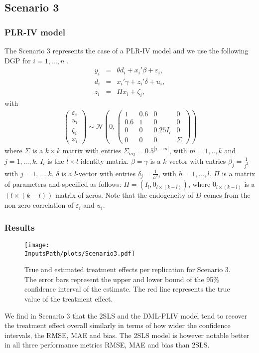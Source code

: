 \documentclass[10pt]{article}
\newcommand*{\InputsFolderPath}{C:/DEV/DML/src/data/}
\newcommand*{\InputsPath}{\InputsFolderPath/20221110/}
\begin{document}
\subsection{Scenario 3}
\subsubsection{PLR-IV model}
The Scenario 3 represents the case of a PLR-IV model and we use the following DGP for $i=1,...,n$ \cite{Cher2015}.
\begin{eqnarray*}\label{dgp_2.1}
y_i &=& \theta d_i + x_i' \beta + \varepsilon_i,	\\
d_i &=& x_i' \gamma + z_i' \delta + u_i, \\
z_i &=& \Pi x_i + \zeta_i, 
\end{eqnarray*}
with
\begin{eqnarray*}\label{dgp_2.2}
	\left(\begin{matrix} \varepsilon_i \\ u_i \\ \zeta_i \\ x_i \end{matrix} \right) \sim
\mathcal{N}\left(0, \left(\begin{matrix} 1 & 0.6 & 0 & 0 \\ 0.6 & 1 & 0 & 0 \\
	0 & 0 & 0.25 I_{l} & 0 \\ 0 & 0 & 0 & \Sigma \end{matrix} \right) \right)
\end{eqnarray*}
where  $\Sigma$ is a $k \times k$ matrix with entries
$\Sigma_{mj} = 0.5^{|j-m|}$, with $m=1,..,k$ and $j=1,...,k$. 
$I_{l}$ is the $l \times l$ identity matrix.
$\beta = \gamma$ is a $k$-vector with entries $\beta_j=\frac{1}{j^2}$ with  $j=1,...,k$.
$\delta$ is a $l$-vector with entries $\delta_j=\frac{1}{h^2}$, with $h=1,...,l$.
$\Pi$ is a matrix of parameters and specified as follows: $\Pi = (I_{l}, 0_{l \times (k - l)})$, where $ 0_{l \times (k - l)}$ is a $(l \times (k-l))$ matrix of zeros.
Note that the endogeneity of $D$ comes from the non-zero correlation of $\varepsilon_i$ and $u_i$.
\subsubsection{Results}
\begin{figure}[H]
	\begin{center}
		\texttt{[image: \\InputsPath/plots/Scenario3.pdf]}
		\caption{True and estimated treatment effects per replication for Scenario 3. The error bars represent the upper and lower bound of the 95\% confidence interval of the estimate. The red line represents the true value of the treatment effect.}
		\label{Scenario3}
	\end{center}
\end{figure}

We find in Scenario 3 that the 2SLS and the DML-PLIV model tend to recover the treatment effect overall similarly in terms of how wider the confidence intervals, the RMSE, MAE and bias.  
The 2SLS model is however notable better in all three performance metrics RMSE, MAE and bias than 2SLS.
\end{document}
